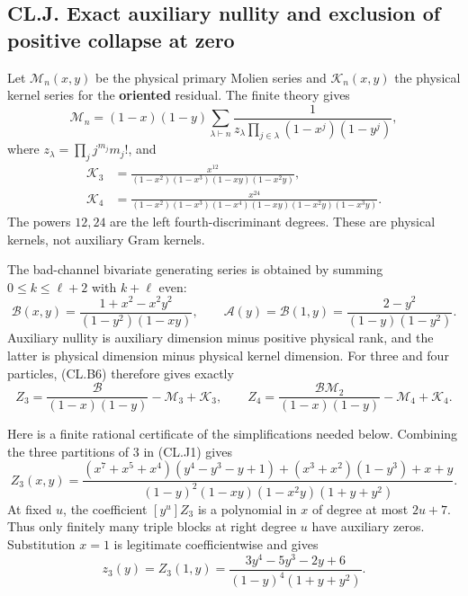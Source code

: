 \hypertarget{cl.j.-exact-auxiliary-nullity-and-exclusion-of-positive-collapse-at-zero}{%
\subsection{CL.J. Exact auxiliary nullity and exclusion of positive collapse at zero}\label{cl.j.-exact-auxiliary-nullity-and-exclusion-of-positive-collapse-at-zero}}

Let \(\mathcal M_n(x,y)\) be the physical primary Molien series and \(\mathcal K_n(x,y)\) the physical kernel series for the \textbf{oriented} residual. The finite theory gives \[
\mathcal M_n=(1-x)(1-y)
\sum_{\lambda\vdash n}
\frac1{z_\lambda\prod_{j\in\lambda}(1-x^j)(1-y^j)},
\tag{CL.J1}
\] where \(z_\lambda=\prod_jj^{m_j}m_j!\), and \[
\begin{aligned}
\mathcal K_3&=\frac{x^{12}}
{(1-x^2)(1-x^3)(1-xy)(1-x^2y)},\\
\mathcal K_4&=\frac{x^{24}}
{(1-x^2)(1-x^3)(1-x^4)(1-xy)(1-x^2y)(1-x^3y)}.
\end{aligned}
\tag{CL.J2}
\] The powers \(12,24\) are the left fourth-discriminant degrees. These are physical kernels, not auxiliary Gram kernels.

The bad-channel bivariate generating series is obtained by summing \(0\leq k\leq\ell+2\) with \(k+\ell\) even: \[
\mathcal B(x,y)
=\frac{1+x^2-x^2y^2}{(1-y^2)(1-xy)},\qquad
\mathcal A(y)=\mathcal B(1,y)
=\frac{2-y^2}{(1-y)(1-y^2)}.
\tag{CL.J3}
\] Auxiliary nullity is auxiliary dimension minus positive physical rank, and the latter is physical dimension minus physical kernel dimension. For three and four particles, (CL.B6) therefore gives exactly \[
Z_3=\frac{\mathcal B}{(1-x)(1-y)}-\mathcal M_3+\mathcal K_3,\qquad
Z_4=\frac{\mathcal B\mathcal M_2}{(1-x)(1-y)}
-\mathcal M_4+\mathcal K_4.
\tag{CL.J4}
\]

Here is a finite rational certificate of the simplifications needed below. Combining the three partitions of \(3\) in (CL.J1) gives \[
Z_3(x,y)=
\frac{(x^7+x^5+x^4)(y^4-y^3-y+1)
+(x^3+x^2)(1-y^3)+x+y}
{(1-y)^2(1-xy)(1-x^2y)(1+y+y^2)}.
\tag{CL.J5}
\] At fixed \(u\), the coefficient \([y^u]Z_3\) is a polynomial in \(x\) of degree at most \(2u+7\). Thus only finitely many triple blocks at right degree \(u\) have auxiliary zeros. Substitution \(x=1\) is legitimate coefficientwise and gives \[
z_3(y)=Z_3(1,y)
=\frac{3y^4-5y^3-2y+6}{(1-y)^4(1+y+y^2)}.
\tag{CL.J6}
\]


